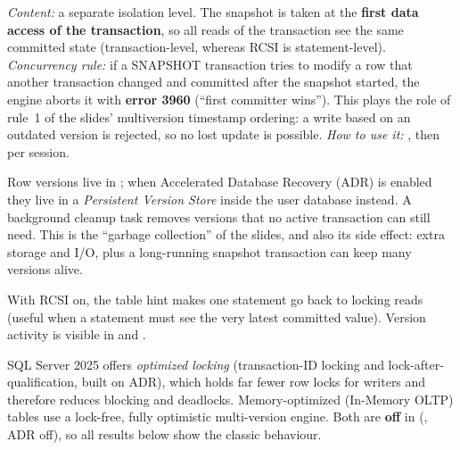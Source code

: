 \emph{Content:} a separate isolation level. The snapshot is taken at the \textbf{first data access of the transaction}, so all reads of the transaction see the same committed state (transaction-level, whereas RCSI is statement-level). \emph{Concurrency rule:} if a SNAPSHOT transaction tries to modify a row that another transaction changed and committed after the snapshot started, the engine aborts it with \textbf{error 3960} (``first committer wins''). This plays the role of rule~1 of the slides' multiversion timestamp ordering: a write based on an outdated version is rejected, so no lost update is possible. \emph{How to use it:} , then  per session.

Row versions live in \textbf{}; when Accelerated Database Recovery (ADR) is enabled they live in a \emph{Persistent Version Store} inside the user database instead. A background cleanup task removes versions that no active transaction can still need. This is the ``garbage collection'' of the slides, and also its side effect: extra storage and I/O, plus a long-running snapshot transaction can keep many versions alive.

With RCSI on, the table hint  makes one statement go back to locking reads (useful when a statement must see the very latest committed value). Version activity is visible in  and .

SQL Server 2025 offers \emph{optimized locking} (transaction-ID locking and lock-after-qualification, built on ADR), which holds far fewer row locks for writers and therefore reduces blocking and deadlocks. Memory-optimized (In-Memory OLTP) tables use a lock-free, fully optimistic multi-version engine. Both are \textbf{off} in  (, ADR off), so all results below show the classic behaviour.

